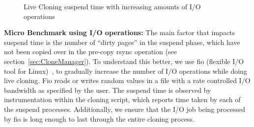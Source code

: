 \begin{figure}[ht]
  \centering
\begin{adjustbox}{max size={.7\textwidth}}
  \end{adjustbox}
  \captionsetup{justification=centering}
  \caption{Live Cloning suspend time with increasing amounts of I/O operations }
  \label{fig:fioResults}
\end{figure}


\noindent
\textbf{Micro Benchmark using I/O operations:}
The main factor that impacts suspend time is the number of ``dirty pages'' in the suspend phase, which have not been copied over in the pre-copy rsync operation (see section~\ref{sec:CloneManager}).
To understand this better, we use fio (flexible I/O tool for Linux)~\cite{fio}, to gradually increase the number of I/O operations while doing live cloning.
Fio reads or writes random values in a file with a rate controlled I/O bandwidth as specified by the user. 
The suspend time is observed by instrumentation within the cloning script, which reports time taken by each of the suspend processes.
Additionally, we ensure that the I/O job being processed by fio is long enough to last through the entire cloning process.

